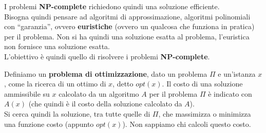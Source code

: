 I problemi \textbf{NP-complete} richiedono quindi una soluzione efficiente.\\
Bisogna quindi pensare ad algoritmi di approssimazione, algoritmi polinomiali
con ``garanzia'', ovvero \textbf{euristiche} (ovvero un qualcosa che funziona in
pratica) per il problema. Non si ha quindi una soluzione esatta al problema,
l'euristica non fornisce una soluzione esatta.\\
L'obiettivo è quindi quello di risolvere i problemi \textbf{NP-complete}.
\begin{definizione}
  Definiamo un \textbf{problema di ottimizzazione}, dato un problema $\Pi$ e
  un'istanza $x$, come la ricerca di un ottimo di $x$, detto $opt(x)$. Il costo
  di una soluzione ammissibile su $x$ calcolato da un algoritmo $A$ per il
  problema $\Pi$ è indicato con $A(x)$ (che quindi è il costo della soluzione
  calcolato da $A$).\\
  
  Si cerca quindi la soluzione, tra tutte quelle di $\Pi$, che massimizza o
  minimizza una funzione costo (appunto $opt(x)$). Non sappiamo chi calcoli
  questo costo.
\end{definizione}
